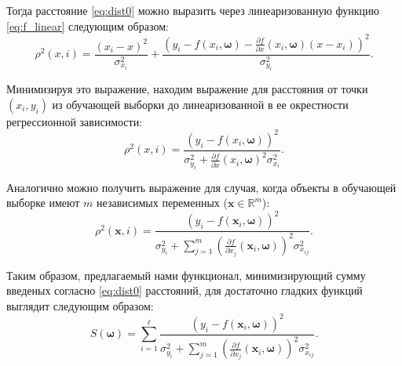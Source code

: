 \documentclass[tikz,11pt,a4paper]{article}
\newcommand{\bomega}{\boldsymbol{\omega}}
\begin{document}
Тогда расстояние \eqref{eq:dist0} можно выразить через линеаризованную функцию
\eqref{eq:f_linear} следующим образом:
\begin{equation}
  \rho^2(x, i) = \frac{(x_i - x)^2}{\sigma_{x_i}^2} + \frac{(y_i - f(x_i, \bomega) - \frac{\partial f}{\partial x}(x_i, \bomega) (x - x_i))^2}{\sigma_{y_i}^2}.
  \label{eq:dist_linear}
\end{equation}

Минимизируя это выражение, находим выражение для расстояния от
точки $(x_i, y_i)$ из обучающей выборки до линеаризованной в ее
окрестности регрессионной зависимости:
\begin{equation}
  \rho^2(x, i) = \frac{(y_i - f(x_i, \bomega))^2}{\sigma^2_{y_i} + \frac{\partial f}{\partial x}(x_i, \bomega)^2 \sigma^2_{x_i}}.
  \label{eq:rho_univar}
\end{equation}

Аналогично можно получить выражение для случая, когда объекты в обучающей выборке
имеют $m$ независимых переменных ($\mathbf{x} \in \mathbb{R}^m$):
\[
  \rho^2(\mathbf{x}, i) = \frac{(y_i - f(\mathbf{x}_i, \bomega))^2}{\sigma_{y_i}^2 + \sum_{j = 1}^m (\frac{\partial f}{\partial x_j}(\mathbf{x}_i, \bomega))^2 \sigma^2_{x_{ij}}}.
\]

Таким образом, предлагаемый нами функционал, минимизирующий сумму введеных согласно \eqref{eq:dist0}
расстояний, для достаточно гладких функций выглядит следующим образом:
\begin{equation}
  S(\bomega) = \sum_{i = 1}^\ell \frac{(y_i - f(\mathbf{x}_i, \bomega))^2}{\sigma_{y_i}^2 + \sum_{j = 1}^m (\frac{\partial f}{\partial x_j}(\mathbf{x}_i, \bomega))^2 \sigma^2_{x_{ij}}}.
  \label{eq:s}
\end{equation}
\end{document}
